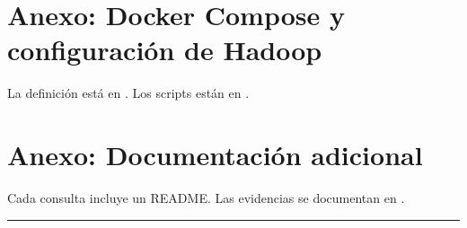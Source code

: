 \documentclass[10pt,a4paper]{article}
\theoremstyle{definition}
\begin{document}
\section{Anexo: Docker Compose y configuración de Hadoop}
La definición está en . Los scripts están en
.
\section{Anexo: Documentación adicional}
Cada consulta incluye un README. Las evidencias se documentan en
.

\vspace{20pt}\hrule\vspace{10pt}


\end{document}
